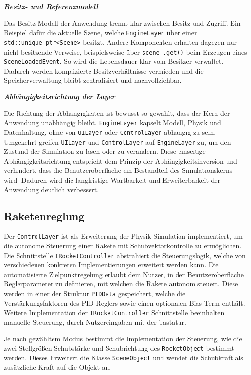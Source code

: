 \documentclass[10pt,twocolumn]{extarticle}
\begin{document}
\textbf{\textit{Besitz- und Referenzmodell}}

Das Besitz-Modell der Anwendung trennt klar zwischen Besitz und Zugriff. 
Ein Beispiel dafür die aktuelle Szene, welche \texttt{EngineLayer} über einen \texttt{std::unique\_ptr<Scene>} besitzt. Andere Komponenten erhalten dagegen nur nicht-besitzende Verweise, beispielsweise über \texttt{scene\_.get()} beim Erzeugen eines \texttt{SceneLoadedEvent}. So wird die Lebensdauer klar vom Besitzer verwaltet. Dadurch werden komplizierte Besitzverhältnisse vermieden und die Speicherverwaltung bleibt zentralisiert und nachvollziehbar.

\textbf{\textit{Abhängigkeitsrichtung der Layer}}

Die Richtung der Abhängigkeiten ist bewusst so gewählt, dass der Kern der Anwendung unabhängig bleibt. \texttt{EngineLayer} kapselt Modell, Physik und Datenhaltung, ohne von \texttt{UILayer} oder \texttt{ControlLayer} abhängig zu sein. Umgekehrt greifen \texttt{UILayer} und \texttt{ControlLayer} auf \texttt{EngineLayer} zu, um den Zustand der Simulation zu lesen oder zu verändern. Diese einseitige Abhängigkeitsrichtung entspricht dem Prinzip der Abhängigkeitsinversion und verhindert, dass die Benutzeroberfläche ein Bestandteil des Simulationskerns wird. Dadurch wird die langfristige Wartbarkeit und Erweiterbarkeit der Anwendung deutlich verbessert.

\subsection{Raketenreglung}
Der \texttt{ControlLayer} ist als Erweiterung der Physik-Simulation implementiert, um die autonome Steuerung einer Rakete mit Schubvektorkontrolle zu ermöglichen. Die Schnittstelle \texttt{IRocketController} abstrahiert die Steuerungslogik, welche von verschiedenen konkreten Implementierungen erweitert werden kann.
Die automatisierte Zielpunktregelung erlaubt dem Nutzer, in der Benutzeroberfläche Reglerparameter zu definieren, mit welchen die Rakete autonom steuert. Diese werden in einer der Struktur \texttt{PIDData} gespeichert, welche die Verstärkungsfaktoren des PID-Reglers sowie einen optionalen Bias-Term enthält.
Weitere Implementation der \texttt{IRocketController} Schnittstelle beeinhalten manuelle Steuerung, durch Nutzereingaben mit der Tastatur.

Je nach gewähltem Modus bestimmt die Implementation der Steuerung, wie die zwei Stellgrößen Schubstärke und Schubrichtung des \texttt{RocketObject} bestimmt werden. Dieses Erweitert die Klasse \texttt{SceneObject} und wendet die Schubkraft als zusätzliche Kraft auf die Objekt an.
\end{document}
